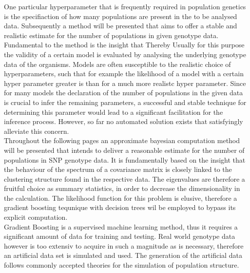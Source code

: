 \documentclass[a4paper, 11pt]{article}
\begin{document}
One particular hyperparameter that is frequently required in population genetics is the specifiaction of how many populations are present in the to be analysed data. Subsequently a method will be presented that aims to offer a stable and realistic estimate for the number of populations in given genotype data. Fundamental to the method is the insight that 
Thereby Usually for this purpose the validity of a certain model is evaluated by analysing the underlying genotype data of the organisms. Models are often susceptible to the realistic choice of hyperparameters, such that for example the likelihood of a model with a certain hyper parameter greater is than for a much more realistc hyper parameter. Since for many models the declaration of the number of populations in the given data is crucial to infer the remaining parameters, a successful and stable technique for determining this parameter would lead to a significant facilitation for the inference process. However, so far no automated solution exists that satisfyingly alleviate this concern. \\
Throughout the following pages an approximate bayesian computation method will be presented that intends to deliver a reasonable estimate for the number of populations in SNP genotype data. It is fundamentally based on the insight that the behaviour of the spectrum of a covariance matrix is closely linked to the clustering structure found in the respective data. The eigenvalues are therefore a fruitful choice as summary statistics, in order to decrease the dimensionality in the calculation. The likelihood function for this problem is elusive, therefore a gradient boosting tequnique with decision trees wil be employed to bypass its explicit computation. \\
Gradient Boosting is a supervised machine learning method, thus it requires a significant amount of data for training and testing. Real world genotype data however is too extensiv to acquire in such a magnitude as is necessary, therefore an artificial data set is simulated and used. The generation of the artificial data follows commonly accepted theories for the simulation of population structure.
\end{document}
